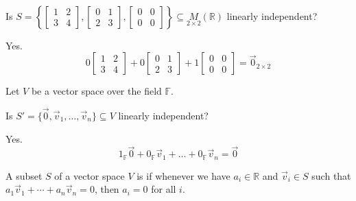 \documentclass[11pt,fleqn]{book} %
\begin{document}
\begin{example}
{~~~}

    Is $S = \left\{ \begin{bmatrix} 1&2\\3&4 \end{bmatrix}, \begin{bmatrix} 0&1\\2&3 \end{bmatrix}, \begin{bmatrix} 0&0\\0&0 \end{bmatrix} \right\} \subseteq \underset{2\times2}{M}(\mathbb{R})$ linearly independent? 
    
    {\color{lightblue} Yes. $$0 \begin{bmatrix} 1&2\\3&4 \end{bmatrix} + 0 \begin{bmatrix} 0&1\\2&3 \end{bmatrix} + 1 \begin{bmatrix} 0&0\\0&0 \end{bmatrix} = \vec{0}_{2\times2}$$ }
\end{example}

\begin{example}
    Let $V$ be a vector space over the field $\mathbb{F}$. 
    
    Is $S' = \{\vec{0}, \vec{v}_1, \dots, \vec{v}_n\} \subseteq V$ linearly independent? 
    
    {\color{lightblue} Yes. $$1_{\mathbb{F}}\vec{0} + 0_{\mathbb{F}}\vec{v}_1 + \dots + 0_{\mathbb{F}}\vec{v}_n = \vec{0}$$ }
\end{example}

\setcounter{section}{4}
\setcounter{definitionT}{3}
\begin{definition}
    A subset $S$ of a vector space $V$ is  if whenever we have $a_i \in \mathbb{R}$ and $\vec{v}_i \in S$ such that $a_1\vec{v}_1 + \cdots + a_n\vec{v}_n = 0$, then $a_i = 0$ for all $i$.
\end{definition}
\setcounter{section}{5}
\end{document}

